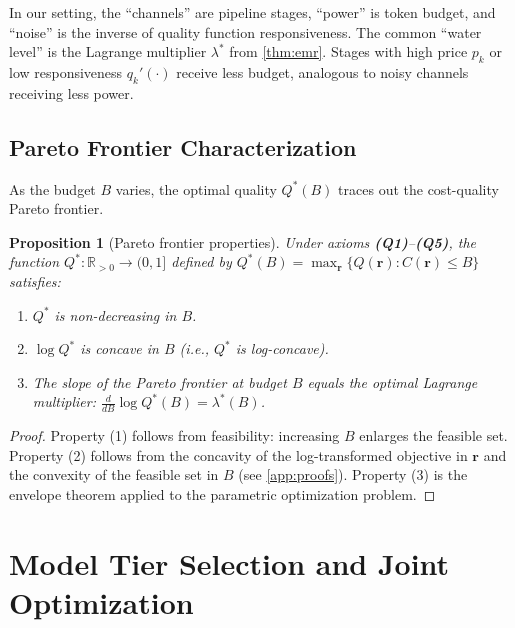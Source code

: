 \documentclass[11pt, a4paper, logo, copyright]{googledeepmind}
\newtheorem{proposition}{Proposition}[section]
\begin{document}
In our setting, the ``channels'' are pipeline stages, ``power'' is token budget, and ``noise'' is the inverse of quality function responsiveness. The common ``water level'' is the Lagrange multiplier $\lambda^*$ from \cref{thm:emr}. Stages with high price $p_k$ or low responsiveness $q_k'(\cdot)$ receive less budget, analogous to noisy channels receiving less power.

\subsection{Pareto Frontier Characterization}

As the budget $B$ varies, the optimal quality $Q^*(B)$ traces out the cost-quality Pareto frontier.

\begin{proposition}[Pareto frontier properties]\label{prop:pareto}
Under axioms \textbf{(Q1)}--\textbf{(Q5)}, the function $Q^*: \mathbb{R}_{>0} \to (0,1]$ defined by $Q^*(B) = \max_{\mathbf{r}} \{Q(\mathbf{r}) : C(\mathbf{r}) \leq B\}$ satisfies:
\begin{enumerate}[nosep]
    \item $Q^*$ is non-decreasing in $B$.
    \item $\log Q^*$ is concave in $B$ (i.e., $Q^*$ is log-concave).
    \item The slope of the Pareto frontier at budget $B$ equals the optimal Lagrange multiplier: $\frac{d}{dB}\log Q^*(B) = \lambda^*(B)$.
\end{enumerate}
\end{proposition}

\begin{proof}
Property (1) follows from feasibility: increasing $B$ enlarges the feasible set. Property (2) follows from the concavity of the log-transformed objective in $\mathbf{r}$ and the convexity of the feasible set in $B$ (see \cref{app:proofs}). Property (3) is the envelope theorem applied to the parametric optimization problem.
\end{proof}


\section{Model Tier Selection and Joint Optimization}\label{sec:mtsp}
\end{document}
